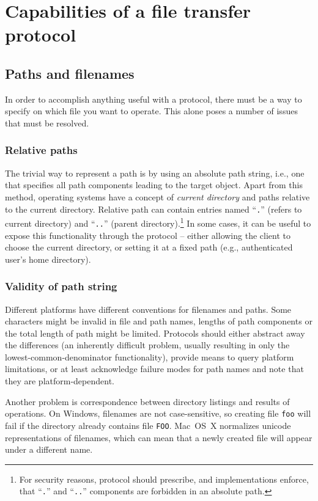 \section{Capabilities of a file transfer protocol}

\subsection{Paths and filenames}

In order to accomplish anything useful with a protocol, there must be a way to specify on which file you want
to operate. This alone poses a number of issues that must be resolved.

\subsubsection{Relative paths}

The trivial way to represent a path is by using an absolute path string, i.e., one that specifies all path
components leading to the target object. Apart from this method, operating systems have a concept of {\it
current directory} and paths relative to the current directory. Relative path can contain entries named
``\texttt{.}'' (refers to current directory) and ``\texttt{..}'' (parent directory).\footnote{For security
reasons, protocol should prescribe, and implementations enforce, that ``\texttt{.}'' and ``\texttt{..}''
components are forbidden in an absolute path.} In some cases, it can be useful to expose this functionality
through the protocol -- either allowing the client to choose the current directory, or setting it at a fixed
path (e.g., authenticated user's home directory).

\subsubsection{Validity of path string}

Different platforms have different conventions for filenames and paths. Some characters might be invalid in
file and path names, lengths of path components or the total length of path might be limited. Protocols should
either abstract away the differences (an inherently difficult problem, usually resulting in only the
lowest-common-denominator functionality), provide means to query platform limitations, or at least acknowledge
failure modes for path names and note that they are platform-dependent.

Another problem is correspondence between directory listings and results of operations. On Windows, filenames
are not case-sensitive, so creating file {\tt foo} will fail if the directory already contains file {\tt FOO}.
Mac~OS~X normalizes unicode representations of filenames, which can mean that a newly created file will appear
under a different name.

